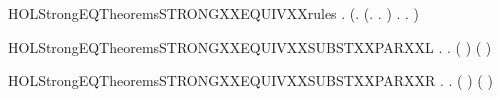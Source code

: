 \newcommand{\HOLStrongEQTheoremsSTRONGXXEQUIVXXREFL}{\UseVerbatim{HOLStrongEQTheoremsSTRONGXXEQUIVXXREFL}}
\begin{SaveVerbatim}{HOLStrongEQTheoremsSTRONGXXEQUIVXXrules}
\HOLTokenTurnstile{} \HOLSymConst{\HOLTokenForall{}} .
       (\HOLSymConst{\HOLTokenForall{}}.
            (\HOLSymConst{\HOLTokenForall{}}.  \HOLTokenTransBegin{}\HOLTokenTransEnd {} \HOLSymConst{\HOLTokenImp{}} \HOLSymConst{\HOLTokenExists{}}.  \HOLTokenTransBegin{}\HOLTokenTransEnd {} \HOLSymConst{\HOLTokenConj{}}   ) \HOLSymConst{\HOLTokenConj{}}
            \HOLSymConst{\HOLTokenForall{}}.  \HOLTokenTransBegin{}\HOLTokenTransEnd {} \HOLSymConst{\HOLTokenImp{}} \HOLSymConst{\HOLTokenExists{}}.  \HOLTokenTransBegin{}\HOLTokenTransEnd {} \HOLSymConst{\HOLTokenConj{}}   ) \HOLSymConst{\HOLTokenImp{}}
         
\end{SaveVerbatim}
\newcommand{\HOLStrongEQTheoremsSTRONGXXEQUIVXXrules}{\UseVerbatim{HOLStrongEQTheoremsSTRONGXXEQUIVXXrules}}
\begin{SaveVerbatim}{HOLStrongEQTheoremsSTRONGXXEQUIVXXSUBSTXXPARXXL}
\HOLTokenTurnstile{} \HOLSymConst{\HOLTokenForall{}} .
          \HOLSymConst{\HOLTokenImp{}}
       \HOLSymConst{\HOLTokenForall{}}.  ( \HOLSymConst{\ensuremath{\parallel}} ) ( \HOLSymConst{\ensuremath{\parallel}} )
\end{SaveVerbatim}
\newcommand{\HOLStrongEQTheoremsSTRONGXXEQUIVXXSUBSTXXPARXXL}{\UseVerbatim{HOLStrongEQTheoremsSTRONGXXEQUIVXXSUBSTXXPARXXL}}
\begin{SaveVerbatim}{HOLStrongEQTheoremsSTRONGXXEQUIVXXSUBSTXXPARXXR}
\HOLTokenTurnstile{} \HOLSymConst{\HOLTokenForall{}} .
          \HOLSymConst{\HOLTokenImp{}}
       \HOLSymConst{\HOLTokenForall{}}.  ( \HOLSymConst{\ensuremath{\parallel}} ) ( \HOLSymConst{\ensuremath{\parallel}} )
\end{SaveVerbatim}

